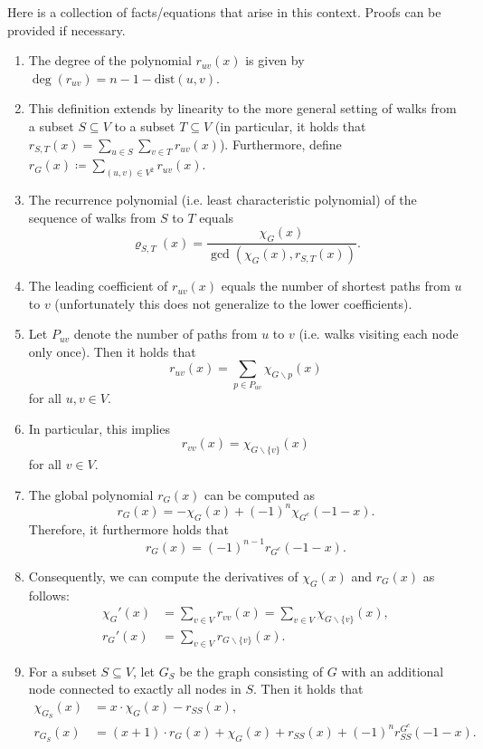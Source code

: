 \documentclass[a4paper,12pt]{article}
\begin{document}
Here is a collection of facts/equations that arise in this context. Proofs can be provided if necessary.
\begin{enumerate}
\item 
The degree of the polynomial $r_{uv}(x)$ is given by $\deg(r_{uv}) = n - 1 - \textrm{dist}(u,v)$.

\item 
This definition extends by linearity to the more general setting of walks from a subset $S\subseteq V$ to a subset $T\subseteq V$ (in particular, it holds that $r_{S,T}(x) = \sum_{u\in S}\sum_{v\in T}r_{uv}(x)$). Furthermore, define $r_G(x) \coloneqq \sum_{(u,v)\in V^2}r_{uv}(x)$.

\item
The recurrence polynomial (i.e. least characteristic polynomial) of the sequence of walks from $S$ to $T$ equals
$$
\varrho_{S,T}(x) = \frac{\chi_G(x)}{\gcd (\chi_G(x),r_{S,T}(x))}.
$$

\item 
The leading coefficient of $r_{uv}(x)$ equals the number of shortest paths from $u$ to $v$ (unfortunately this does not generalize to the lower coefficients).

\item 
Let $P_{uv}$ denote the number of paths from $u$ to $v$ (i.e. walks visiting each node only once). Then it holds that
$$
r_{uv}(x) = \sum_{p \in P_{uv}} \chi_{G \backslash p} (x)
$$
for all $u,v \in V$.

\item 
In particular, this implies
$$
r_{vv}(x) = \chi_{G \backslash\{v\}}(x)
$$
for all $v \in V$.

\item 
The global polynomial $r_G(x)$ can be computed as
$$
r_G(x) = -\chi_G(x) + (-1)^n \chi_{G^c}(-1-x).
$$
Therefore, it furthermore holds that
$$
r_G(x) = (-1)^{n-1} r_{G^c}(-1-x).
$$

\item
Consequently, we can compute the derivatives of $\chi_G(x)$ and $r_G(x)$ as follows:
\begin{align*}
\chi_G'(x) &= \sum_{v\in V}r_{vv}(x) = \sum_{v\in V} \chi_{G \backslash\{v\}}(x),\\
r_G'(x) &= \sum_{v\in V} r_{G \backslash\{v\}}(x).
\end{align*}

\item 
For a subset $S \subseteq V$, let $G_S$ be the graph consisting of $G$ with an additional node connected to exactly all nodes in $S$. Then it holds that
\begin{align*}
\chi_{G_S}(x) &= x\cdot \chi_G(x) - r_{SS}(x),\\
r_{G_S}(x) &= (x+1)\cdot r_G(x) + \chi_G(x) + r_{SS}(x) + (-1)^nr_{SS}^{G^c}(-1-x).
\end{align*}


\end{enumerate}
\end{document}
